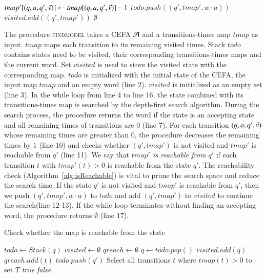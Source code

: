 {\begin{algorithm}[H]
\begin{algorithmic}[1]
          \State $tmap'[(q, a, q', \vec{v})] \gets tmap[(q, a, q', \vec{v})] - 1$
            \State $todo.push((q', tmap', w\cdot a))$
            \State $visited.add((q', tmap'))$
          \EndIf
        \EndFor
      \EndWhile
      \State \Return $\emptyset$ 
  \EndProcedure
  \end{algorithmic}
  \end{algorithm}

 The procedure \textsc{findmodel} takes a CEFA $\mathcal{A}$ and a transitions-times map $tmap$ as input. $tmap$ maps each transition to its remaining visited times. Stack $todo$ contains states need to be visited, their corresponding transitions-times maps and the current word. Set $visited$ is used to store the visited state with the corresponding map. $todo$ is initialized with the initial state of the CEFA, the input map $tmap$ and an empty word (line 2). $visited$ is initialized as an empty set (line 3).
 In the while loop from line 4 to line 16, the state combined with its transitions-times map is searched by the depth-first search algorithm. During the search process, the procedure returns the word if the state is an accepting state and all remaining times of transitions are $0$ (line 7). For each transition $(q, a, q', \vec{v})$ whose remaining times are greater than $0$, the procedure decreases the remaining times by $1$ (line 10) and checks whether $(q', tmap')$ is not visited and $tmap'$ is reachable from $q'$ (line 11). We say that \textit{$tmap'$ is reachable from $q'$} if each transition $t$ with $tmap'(t)> 0$ is reachable from the state $q'$. The reachability check (Algorithm~\ref{alg:isReachable}) is vital to prune the search space and reduce the search time. If the state $q'$ is not visited and $tmap'$ is reachable from $q'$, then we push $(q', tmap', w\cdot a)$ to $todo$ and add $(q', tmap')$ to $visited$ to continue the search(line 12-13). If the while loop terminates without finding an accepting word, the procedure returns $\emptyset$ (line 17).  
  
  \begin{algorithm}[H]
    \caption{Check whether the map is reachable from the state}\label{alg:isReachable}
    \begin{algorithmic}[1]
      \State $todo \gets Stack(q)$
      \State $visited \gets \emptyset$
      \State $qreach \gets \emptyset$
        \State $q \gets todo.pop()$
        \State $visited.add(q)$
          \State $qreach.add(t)$
            \State $todo.push(q')$
          \EndIf
        \EndFor
      \EndWhile
      \State Select all transitions $t$ where $tmap(t)>0$ to set $T$
        \State \Return \textit{true}  
      \Else 
        \State \Return \textit{false}
      \EndIf
      \EndProcedure
    \end{algorithmic}
  \end{algorithm}

}
